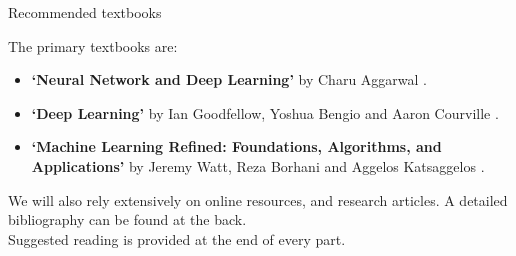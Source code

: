 \begin{frame}{Recommended textbooks}

  The primary textbooks are:\\
  \begin{itemize}
    \item 
    {\bf `Neural Network and Deep Learning'} 
    by Charu Aggarwal 
    \cite{Aggarwal:2018SpringerDL}.
    \item
    {\bf `Deep Learning'} 
    by Ian Goodfellow, Yoshua Bengio and Aaron Courville 
    \cite{Goodfellow:2017MITDL}.
    \item
    {\bf `Machine Learning Refined: Foundations, Algorithms, and Applications'}
     by Jeremy Watt, Reza Borhani and Aggelos Katsaggelos
     \cite{Watt:2016Cambridge}.
  \end{itemize}

  We will also rely extensively on online resources, and research articles. 
  A detailed bibliography can be found at the back.\\

  Suggested reading is provided at the end of every part.\\

\end{frame}
